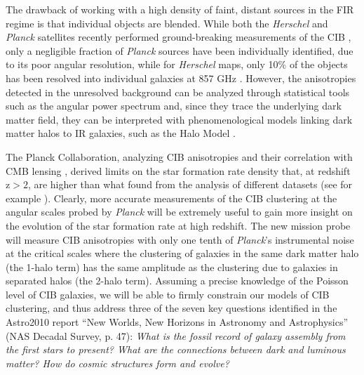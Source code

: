 The drawback of working with a
high density of faint, distant sources in the FIR regime is that
individual objects are blended. While both the {\it Herschel} and {\it Planck} satellites
recently performed ground-breaking measurements of the CIB
\citep{amblard2011,viero2013a,planck2014-XXX,mak2016}, only a
negligible fraction of {\it Planck} sources have been individually
identified, due to its poor angular resolution, while for
{\it Herschel} maps, only 10$\%$ of the objects
has been resolved into individual galaxies at 857 GHz \cite{bethermin2010}.
However, the anisotropies detected in the
unresolved background can be analyzed through statistical tools
such as the angular power spectrum \citep{knox2001} and, since they trace the
underlying dark matter field, they can be interpreted with
phenomenological models linking dark matter halos to IR galaxies,
such as the Halo Model \cite{cooray2002,shang2012}.

The Planck Collaboration, analyzing CIB anisotropies and their
correlation with CMB lensing \citep{planck2014-XXX,planckXVIII},
derived limits on the star formation rate density that,
at redshift $\mathrm{z>2}$, are higher than what found from the analysis of
different datasets (see for example \cite{madau2014}).
Clearly, more accurate measurements of the CIB clustering at the
angular scales probed by {\it Planck} will be extremely useful to
gain more insight on the evolution of the star formation rate at
high redshift. The new mission probe will measure CIB anisotropies
with only one tenth of {\it Planck}'s instrumental noise at the critical
scales where the clustering of galaxies in the same dark matter
halo (the 1-halo term) has the same amplitude as the
clustering due to galaxies in separated halos
(the 2-halo term). Assuming a precise knowledge of the
Poisson level of CIB
galaxies, we will be able to firmly
constrain our models of CIB clustering,
and thus address three of the seven key questions
identified in the Astro2010 report
``New Worlds, New Horizons in Astronomy and Astrophysics''
(NAS Decadal Survey, p. 47):
{\it What is the fossil record of galaxy assembly                                                   
from the first stars to present? What are the connections                                           
between dark and luminous matter?
How do cosmic structures form and evolve?}

